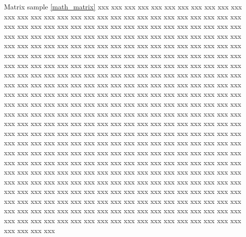 \documentclass[a4paper]{book}
\begin{document}
Matrix sample \eqref{math_matrix} 
xxx xxx xxx xxx xxx xxx xxx xxx xxx xxx xxx xxx xxx xxx xxx xxx xxx xxx xxx xxx xxx xxx xxx xxx xxx xxx xxx xxx xxx xxx xxx xxx xxx xxx xxx xxx xxx xxx xxx xxx xxx xxx xxx xxx xxx xxx xxx xxx xxx xxx xxx xxx xxx xxx xxx xxx xxx xxx xxx xxx xxx xxx xxx xxx xxx xxx xxx xxx xxx xxx xxx xxx xxx xxx xxx xxx xxx xxx xxx xxx xxx xxx xxx xxx xxx xxx xxx xxx xxx xxx xxx xxx xxx xxx xxx xxx xxx xxx xxx xxx xxx xxx xxx xxx xxx xxx xxx xxx xxx xxx xxx xxx xxx xxx xxx xxx xxx xxx xxx xxx xxx xxx xxx xxx xxx xxx xxx xxx xxx xxx xxx xxx xxx xxx xxx xxx xxx xxx xxx xxx xxx xxx xxx xxx xxx xxx xxx xxx xxx xxx xxx xxx xxx xxx xxx xxx xxx xxx xxx xxx xxx xxx xxx xxx xxx xxx xxx xxx xxx xxx xxx xxx xxx xxx xxx xxx xxx xxx xxx xxx xxx xxx xxx xxx xxx xxx xxx xxx xxx xxx xxx xxx xxx xxx xxx xxx xxx xxx xxx xxx xxx xxx xxx xxx xxx xxx xxx xxx xxx xxx xxx xxx xxx xxx xxx xxx xxx xxx xxx xxx xxx xxx xxx xxx xxx xxx xxx xxx xxx xxx xxx xxx xxx xxx xxx xxx xxx xxx xxx xxx xxx xxx xxx xxx xxx xxx xxx xxx xxx xxx xxx xxx xxx xxx xxx xxx xxx xxx xxx xxx xxx xxx xxx xxx xxx xxx xxx xxx xxx xxx xxx xxx xxx xxx xxx xxx xxx xxx xxx xxx xxx xxx xxx xxx xxx xxx xxx xxx xxx xxx xxx xxx xxx xxx xxx xxx xxx xxx xxx xxx xxx xxx xxx xxx xxx xxx xxx xxx xxx xxx xxx xxx xxx xxx xxx xxx xxx xxx xxx xxx xxx xxx xxx xxx xxx xxx xxx xxx xxx xxx xxx xxx xxx xxx xxx xxx xxx xxx xxx xxx xxx xxx xxx xxx xxx xxx xxx xxx xxx xxx xxx xxx xxx xxx xxx xxx xxx xxx xxx xxx xxx xxx xxx xxx xxx xxx xxx xxx xxx xxx xxx xxx xxx xxx xxx xxx xxx xxx xxx xxx xxx xxx xxx xxx xxx xxx xxx xxx xxx xxx xxx xxx xxx xxx xxx xxx xxx xxx xxx xxx xxx xxx xxx xxx xxx xxx xxx xxx xxx xxx xxx 



\end{document}
